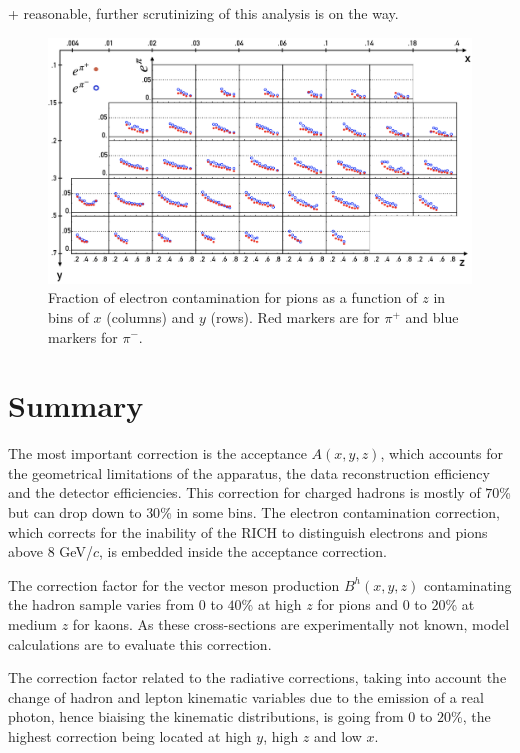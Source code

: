 + reasonable, further scrutinizing of this analysis is on the way.

\begin{figure}
	\includegraphics[scale=0.7]{./gfx/econt.png}
	\caption{Fraction of electron contamination for pions as a function of $z$ in bins of $x$ (columns) and $y$ (rows). Red markers are for $\pi^+$ and blue markers for $\pi^-$.}
	\label{pic:epi}
\end{figure}

\newpage

\section{Summary}

The most important correction is the acceptance $A(x,y,z)$, which accounts for the geometrical limitations of the apparatus, the data reconstruction efficiency and the detector efficiencies. This correction for charged hadrons is mostly of $70$\% but can drop down to $30$\% in some bins. The electron contamination correction, which corrects for the inability of the RICH to distinguish electrons and pions above $8$ GeV/$c$, is embedded inside the acceptance correction.

The correction factor for the vector meson production $B^h(x,y,z)$ contaminating the hadron sample varies from $0$ to $40$\% at high $z$ for pions and $0$ to $20$\% at medium $z$ for kaons. As these cross-sections are experimentally not known, model calculations are to evaluate this correction.

The correction factor related to the radiative corrections, taking into account the change of hadron and lepton kinematic variables due to the emission of a real photon, hence biaising the kinematic distributions, is going from $0$ to $20$\%, the highest correction being located at high $y$, high $z$ and low $x$.
